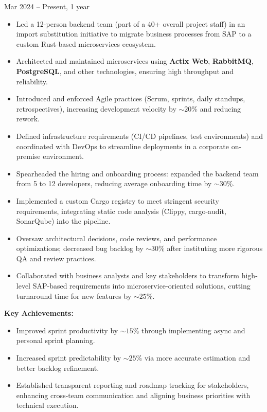 \documentclass[a4paper,12pt]{article}
\begin{document}
\quad Mar 2024 – Present, 1 year

\begin{itemize}[leftmargin=15pt]
    \item Led a 12-person backend team (part of a 40+ overall project staff) in an import substitution initiative to migrate business processes from SAP to a custom Rust-based microservices ecosystem.
    \item Architected and maintained microservices using \textbf{Actix Web}, \textbf{RabbitMQ}, \textbf{PostgreSQL}, and other technologies, ensuring high throughput and reliability.
    \item Introduced and enforced Agile practices (Scrum, sprints, daily standups, retrospectives), increasing development velocity by \(\sim 20\%\) and reducing rework.
    \item Defined infrastructure requirements (CI/CD pipelines, test environments) and coordinated with DevOps to streamline deployments in a corporate on-premise environment.
    \item Spearheaded the hiring and onboarding process: expanded the backend team from 5 to 12 developers, reducing average onboarding time by \(\sim 30\%\).
    \item Implemented a custom Cargo registry to meet stringent security requirements, integrating static code analysis (Clippy, cargo-audit, SonarQube) into the pipeline.
    \item Oversaw architectural decisions, code reviews, and performance optimizations; decreased bug backlog by \(\sim 30\%\) after instituting more rigorous QA and review practices.
    \item Collaborated with business analysts and key stakeholders to transform high-level SAP-based requirements into microservice-oriented solutions, cutting turnaround time for new features by \(\sim 25\%\).
\end{itemize}

\textbf{Key Achievements:}
\begin{itemize}[leftmargin=15pt]
    \item Improved sprint productivity by \(\sim 15\%\) through implementing async and personal sprint planning.
    \item Increased sprint predictability by \(\sim 25\%\) via more accurate estimation and better backlog refinement.
    \item Established transparent reporting and roadmap tracking for stakeholders, enhancing cross-team communication and aligning business priorities with technical execution.
\end{itemize}
\end{document}
